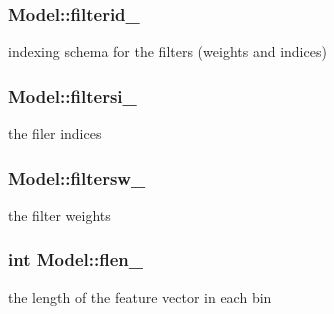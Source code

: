 \subsubsection[{filterid\+\_\+}]{ Model\+::filterid\+\_\+\hspace{0.3cm}{\ttfamily [protected]}}\label{classModel_a08e65111230ab010535cc9485dfd6d0d}


indexing schema for the filters (weights and indices) 

\hypertarget{classModel_ab3f13d90cc96c70d4b454db12528f85f}{}
\subsubsection[{filtersi\+\_\+}]{ Model\+::filtersi\+\_\+\hspace{0.3cm}{\ttfamily [protected]}}\label{classModel_ab3f13d90cc96c70d4b454db12528f85f}


the filer indices 

\hypertarget{classModel_ac8594fac5ef6d874cf0a4f2fd856914d}{}
\subsubsection[{filtersw\+\_\+}]{ Model\+::filtersw\+\_\+\hspace{0.3cm}{\ttfamily [protected]}}\label{classModel_ac8594fac5ef6d874cf0a4f2fd856914d}


the filter weights 

\hypertarget{classModel_afafec86aa7175a4664ae76d545f084ea}{}
\subsubsection[{flen\+\_\+}]{\setlength{\rightskip}{0pt plus 5cm}int Model\+::flen\+\_\+\hspace{0.3cm}{\ttfamily [protected]}}\label{classModel_afafec86aa7175a4664ae76d545f084ea}


the length of the feature vector in each bin 

\hypertarget{classModel_afca3bde5ad33e936c455d3d311b8406d}{}
